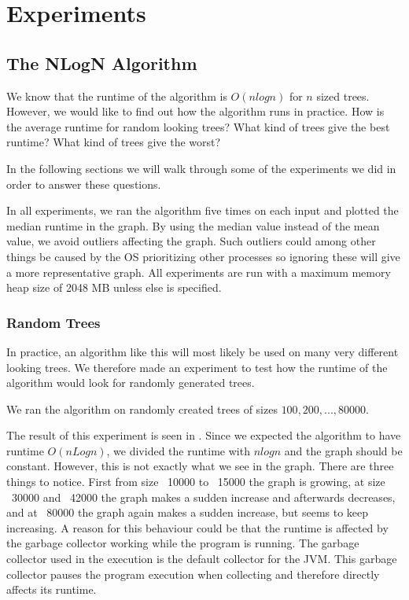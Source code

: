 \chapter{Experiments}
\section{The NLogN Algorithm}
We know that the runtime of the algorithm is $O(nlogn)$ for $n$ sized trees. However, we would like to find out how the algorithm runs in practice. How is the average runtime for random looking trees? What kind of trees give the best runtime? What kind of trees give the worst?

In the following sections we will walk through some of the experiments we did in order to answer these questions.

In all experiments, we ran the algorithm five times on each input and plotted the median runtime in the graph. By using the median value instead of the mean value, we avoid outliers affecting the graph. Such outliers could among other things be caused by the OS prioritizing other processes so ignoring these will give a more representative graph. All experiments are run with a maximum memory heap size of 2048 MB unless else is specified.

\subsection{Random Trees}
In practice, an algorithm like this will most likely be used on many very different looking trees. We therefore made an experiment to test how the runtime of the algorithm would look for randomly generated trees.

We ran the algorithm on randomly created trees of sizes $100, 200, ..., 80000$.

The result of this experiment is seen in . Since we expected the algorithm to have runtime $O(nLogn)$, we divided the runtime with $nlogn$ and the graph should be constant. However, this is not exactly what we see in the graph. There are three things to notice. First from size ~10000 to ~15000 the graph is growing, at size ~30000 and ~42000 the graph makes a sudden increase and afterwards decreases, and at ~80000 the graph again makes a sudden increase, but seems to keep increasing. A reason for this behaviour could be that the runtime is affected by the garbage collector working while the program is running. The garbage collector used in the execution is the default collector for the JVM. This garbage collector pauses the program execution when collecting and therefore directly affects its runtime.


